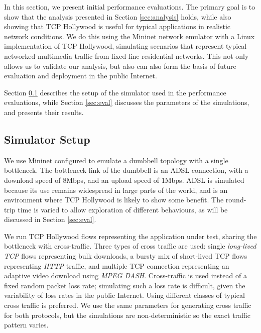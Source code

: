 
In this section, we present initial performance evaluations. The primary goal 
is to show that the analysis presented in Section \ref{sec:analysis} holds,
while also showing that TCP Hollywood is useful for typical applications in realistic
network conditions.
We do this using the Mininet network emulator with a Linux implementation of TCP
Hollywood, simulating scenarios that represent typical networked multimedia
traffic from fixed-line residential networks.
This not only allows us to validate our analysis, but also can also form the
basis of future evaluation and deployment in the public Internet.


Section \ref{sec:simulator} describes the setup of the simulator used in the performance
evaluations, while Section \ref{sec:eval} discusses the parameters of the simulations,
and presents their results.

\subsection{Simulator Setup}
\label{sec:simulator}

We use Mininet configured to emulate a dumbbell topology with a single bottleneck.
The bottleneck link of the dumbbell is an ADSL connection, with a download speed
of 8Mbps, and an upload speed of 1Mbps. ADSL is simulated because its use remains
widespread in large parts of the world, and is an environment where TCP Hollywood
is likely to show some benefit. The round-trip time is varied to allow exploration
of different behaviours, as will be discussed in Section \ref{sec:eval}.

We run TCP Hollywood flows representing the application under test, sharing the
bottleneck with cross-traffic. Three types of cross traffic are used:
single \emph{long-lived TCP} flows representing bulk downloads,
a bursty mix of short-lived TCP flows representing \emph{HTTP} traffic,
and multiple TCP connection representing an adaptive video download using
\emph{MPEG DASH}. Cross-traffic is used instead of a fixed random packet loss
rate; simulating such a loss rate is difficult, given the variability of
loss rates in the public Internet. Using different classes of typical cross
traffic is preferred.  We use the same parameters for generating cross
traffic for both protocols, but the simulations are non-deterministic so
the exact traffic pattern varies.

